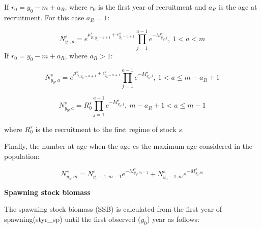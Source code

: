 \documentclass{article}
\begin{document}
If $r_0 = y_0-m+a_R$, where $r_0$ is the first year of recruitment and $a_R$ is the age at recruitment. For this case $a_R=1$:

\begin{equation}
N^s_{y_0,a}=e^{\mu_{R,y_0-a+1}^s + \epsilon^s_{y_0-a+1}}
            \prod_{j=1}^{a-1}e^{-M^s_{y_0,j}}, \ 1<a<m
\end{equation}
If $r_0 = y_0-m+a_R$, where $a_R>1$:

\begin{equation}
N^s_{y_0,a}=e^{\mu_{R,y_0-a+1}^s + \epsilon^s_{y_0-a+1}}                          \prod_{j=1}^{a-1}e^{-M^s_{y_0,j}}, \ 1<a\leq m-a_R+1
\end{equation}

\begin{equation}
N^s_{y_0,a}=R_0^s\prod_{j=1}^{a-1}e^{-M^s_{y_0,j}}, \ m-a_R+1<a\leq m-1
\end{equation}

where $R_0^s$ is the recruitment to the first regime of stock $s$.

Finally, the number at age when the age es the maximum age considered in the population:

\begin{equation}
N^s_{y_0,m}=N^s_{y_0-1,m-1}e^{-M^s_{y_0,m-1}}+N^s_{y_0-1,m}e^{-M^s_{y_0,m}}
\end{equation}




\textbf{Spawning stock biomass}

The spawning stock biomass (SSB) is calculated from the first year of spawning(styr\_sp) until the first observed ($y_0$) year as follows:
\end{document}
